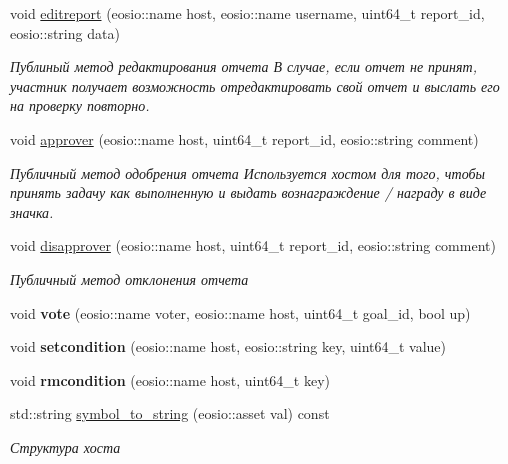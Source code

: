 \begin{DoxyCompactItemize}
$$void \mbox{\hyperlink{classeosio_1_1unicore_ad041a75ade13b77f67f54c99f7ca7d29}{editreport}} (eosio\+::name host, eosio\+::name username, uint64\+\_\+t report\+\_\+id, eosio\+::string data)
\begin{DoxyCompactList}\small\item\em Публиный метод редактирования отчета В случае, если отчет не принят, участник получает возможность отредактировать свой отчет и выслать его на проверку повторно. \end{DoxyCompactList}\item 
void \mbox{\hyperlink{classeosio_1_1unicore_a765b3c6b36dc26922fec8c1236e3d154}{approver}} (eosio\+::name host, uint64\+\_\+t report\+\_\+id, eosio\+::string comment)
\begin{DoxyCompactList}\small\item\em Публичный метод одобрения отчета Используется хостом для того, чтобы принять задачу как выполненную и выдать вознаграждение / награду в виде значка. \end{DoxyCompactList}\item 
void \mbox{\hyperlink{classeosio_1_1unicore_a403175c6abbcf360d36ec0259bccc109}{disapprover}} (eosio\+::name host, uint64\+\_\+t report\+\_\+id, eosio\+::string comment)
\begin{DoxyCompactList}\small\item\em Публичный метод отклонения отчета \end{DoxyCompactList}\item 
\mbox{\label{classeosio_1_1unicore_a9f959b326fccc37b6d0edff7ac941c77}} 
void {\bfseries vote} (eosio\+::name voter, eosio\+::name host, uint64\+\_\+t goal\+\_\+id, bool up)
\item 
\mbox{\label{classeosio_1_1unicore_a11379b173a7701fce57491ed285a7f24}} 
void {\bfseries setcondition} (eosio\+::name host, eosio\+::string key, uint64\+\_\+t value)
\item 
\mbox{\label{classeosio_1_1unicore_a600c89c52dedf76705f46bc2caef60f7}} 
void {\bfseries rmcondition} (eosio\+::name host, uint64\+\_\+t key)
\item 
std\+::string \mbox{\hyperlink{classeosio_1_1unicore_a2464971a6336dedb991282d0b396177e}{symbol\+\_\+to\+\_\+string}} (eosio\+::asset val) const
\begin{DoxyCompactList}\small\item\em Структура хоста \end{DoxyCompactList}\end{DoxyCompactItemize}
